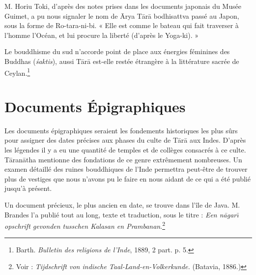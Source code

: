 \documentclass[a4paper, 11pt, oneside, french]{article}
\begin{document}
M. Horiu Toki, d'après des notes prises dans les documents japonais du Musée Guimet, a pu nous signaler le nom de \={A}rya T\={a}r\={a} bodhisattva passé au Japon, sous la forme de Ro-tara-ni-bi. « Elle est comme le bateau qui fait traverser à l'homme l'Océan, et lui procure la liberté (d'après le Yoga-ki). »

Le bouddhisme du sud n'accorde point de place aux énergies féminines des Buddhas (\emph{\'{s}aktis}), aussi T\={a}r\={a} est-elle restée étrangère à la littérature sacrée de Ceylan.\footnote{Barth. \emph{Bulletin des religions de l'Inde}, 1889, 2 part. p. 5.}
\clearpage
\section{Documents Épigraphiques}
\paragraph{}
Les documents épigraphiques seraient les fondements historiques les plus sûrs pour assigner des dates précises aux phases du culte de T\={a}r\={a} aux Indes. D'après les légendes il y a eu une quantité de temples et de collèges consacrés à ce culte. T\={a}ran\={a}tha mentionne des fondations de ce genre extrêmement nombreuses. Un examen détaillé des ruines bouddhiques de l'Inde permettra peut-être de trouver plus de vestiges que nous n'avons pu le faire en nous aidant de ce qui a été publié jusqu'à présent.

Un document précieux, le plus ancien en date, se trouve dans l'île de Java. M. Brandes l'a publié tout au long, texte et traduction, sous le titre : \emph{Een n\={a}gar\={\i} opschrift gevonden tusschen Kalasan en Prambanan}.\footnote{Voir : \emph{Tijdschrift von indische Taal-Land-en-Volkerkunde.} (Batavia, 1886.)}
\end{document}
